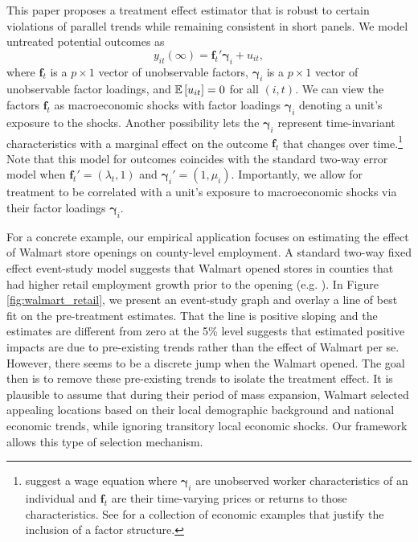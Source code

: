 \documentclass[12pt]{article}
\begin{document}
This paper proposes a treatment effect estimator that is robust to certain violations of parallel trends while remaining consistent in short panels. We model untreated potential outcomes as
\begin{equation}\label{eq:untreated_po}
y_{it}(\infty) = \bm{f}_t' \bm{\gamma}_i + u_{it},
\end{equation}
where $\bm f_t$ is a $p \times 1$ vector of unobservable factors, $\bm \gamma_i$ is a $p \times 1$ vector of unobservable factor loadings, and $\mathbb{E}\left[u_{it}\right] = 0$ for all $(i,t)$. We can view the factors $\bm f_t$ as macroeconomic shocks with factor loadings $\bm \gamma_i$ denoting a unit's exposure to the shocks. Another possibility lets the $\bm \gamma_i$ represent time-invariant characteristics with a marginal effect on the outcome $\bm f_t$ that changes over time.\footnote{\citet{Ahn_Lee_Schmidt_2013} suggest a wage equation where $\bm \gamma_i$ are unobserved worker characteristics of an individual and $\bm f_t$ are their time-varying prices or returns to those characteristics. See \citet{Bai_2009} for a collection of economic examples that justify the inclusion of a factor structure.} Note that this model for outcomes coincides with the standard two-way error model when $\bm f_t' = (\lambda_t, 1)$ and $\bm \gamma_i' = (1, \mu_i)$. Importantly, we allow for treatment to be correlated with a unit's exposure to macroeconomic shocks via their factor loadings $\bm{\gamma}_i$. 

For a concrete example, our empirical application focuses on estimating the effect of Walmart store openings on county-level employment. A standard two-way fixed effect event-study model suggests that Walmart opened stores in counties that had higher retail employment growth prior to the opening (e.g. \citet{neumark2008effects}). In Figure \ref{fig:walmart_retail}, we present an event-study graph and overlay a line of best fit on the pre-treatment estimates. That the line is positive sloping and the estimates are different from zero at the 5\% level suggests that estimated positive impacts are due to pre-existing trends rather than the effect of Walmart per se. However, there seems to be a discrete jump when the Walmart opened. The goal then is to remove these pre-existing trends to isolate the treatment effect. It is plausible to assume that during their period of mass expansion, Walmart selected appealing locations based on their local demographic background and national economic trends, while ignoring transitory local economic shocks. Our framework allows this type of selection mechanism.
\end{document}
